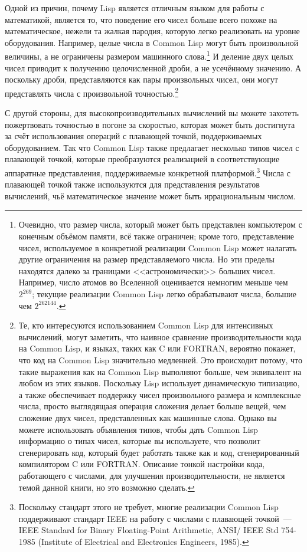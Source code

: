 Одной из причин, почему Lisp является отличным языком для работы с математикой, является
то, что поведение его чисел больше всего похоже на математическое, нежели та жалкая
пародия, которую легко реализовать на уровне оборудования.  Например, целые числа в Common
Lisp могут быть произвольной величины, а не ограничены размером машинного
слова.\footnote{Очевидно, что размер числа, который может быть представлен компьютером с
  конечным объёмом памяти, всё также ограничен; кроме того, представление чисел,
  используемое в конкретной реализации Common Lisp может налагать другие ограничения на
  размер представляемого числа.  Но эти пределы находятся далеко за границами
  <<астрономически>> больших чисел.  Например, число атомов во Вселенной оценивается
  немногим меньше чем $2^{269}$; текущие реализации Common Lisp легко обрабатывают числа,
  большие чем $2^{262144}$.}  И деление двух целых чисел приводит к получению
целочисленной дроби, а не усечённому значению.  А поскольку дроби, представляются как пары
произвольных чисел, они могут представлять числа с произвольной точностью.\footnote{Те,
  кто интересуются использованием Common Lisp для интенсивных вычислений, могут заметить,
  что наивное сравнение производительности кода на Common Lisp, и языках, таких как C или
  FORTRAN, вероятно покажет, что код на Common Lisp значительно медленней.  Это происходит
  потому, что такие выражения как  на Common Lisp выполняют больше, чем
  эквивалент  на любом из этих языков.  Поскольку Lisp использует динамическую
  типизацию, а также обеспечивает поддержку чисел произвольного размера и комплексные
  числа, просто выглядящаая операция сложения делает больше вещей, чем сложение двух
  чисел, представленных как машинные слова.  Однако вы можете использовать объявления
  типов, чтобы дать Common Lisp информацию о типах чисел, которые вы используете, что
  позволит сгенерировать код, который будет работать также как и код, сгенерированный
  компилятором C или FORTRAN.  Описание тонкой настройки кода, работающего с числами, для
  улучшения производительности, не является темой данной книги, но это возможно сделать.}

С другой стороны, для высокопроизводительных вычислений вы можете захотеть пожертвовать
точностью в погоне за скоростью, которая может быть достигнута за счёт использования
операций с плавающей точкой, поддерживаемых оборудованием.  Так что Common Lisp также
предлагает несколько типов чисел с плавающей точкой, которые преобразуются реализацией в
соответствующие аппаратные представления, поддерживаемые конкретной
платформой.\footnote{Поскольку стандарт этого не требует, многие реализации Common Lisp
  поддерживают стандарт IEEE на работу с числами с плавающей точкой~--- IEEE Standard for
  Binary Floating-Point Arithmetic, ANSI/ IEEE Std 754-1985 (Institute of Electrical and
  Electronics Engineers, 1985).}  Числа с плавающей точкой также используются для
представления результатов вычислений, чьё математическое значение может быть
иррациональным числом.

